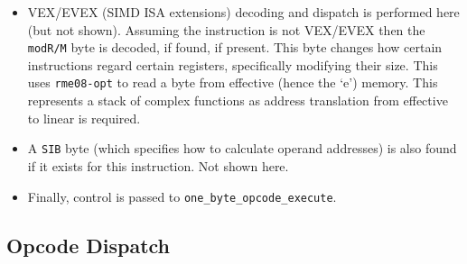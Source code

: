 \documentclass[a4paper]{article}
\begin{document}
\begin{tcolorbox}[breakable]
\begin{itemize}
  \item VEX/EVEX (SIMD ISA extensions) decoding and dispatch is performed here (but not shown).  Assuming the instruction is not VEX/EVEX then the \texttt{modR/M} byte is decoded, if found, if present.  This byte changes how certain instructions regard certain registers, specifically modifying their size.  This uses \texttt{rme08-opt} to read a byte from effective (hence the `e') memory.  This represents a stack of complex functions as address translation from effective to linear is required.

  \item A \texttt{SIB} byte (which specifies how to calculate operand addresses) is also found if it exists for this instruction.  Not shown here.

  \item Finally, control is passed to \texttt{one\_byte\_opcode\_execute}.
\end{itemize}

\end{tcolorbox}

\subsection{Opcode Dispatch}
\end{document}
